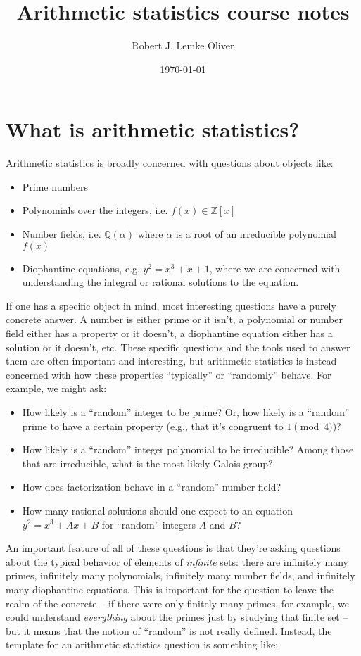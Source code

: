 \documentclass[12pt]{amsart}
\title{Arithmetic statistics course notes}
\author{Robert J. Lemke Oliver}
\date{\today}
\theoremstyle{definition} \newtheorem*{notation}{Notation}
\theoremstyle{remark} \newtheorem*{remark}{Remark}
\numberwithin{equation}{section}
\numberwithin{theorem}{section}
\begin{document}
	\maketitle
	
	\setcounter{section}{-1}
\section{What is arithmetic statistics?}
	
	Arithmetic statistics is broadly concerned with questions about objects like:
		\begin{itemize}
			\item Prime numbers
			\item Polynomials over the integers, i.e. $f(x) \in \mathbb{Z}[x]$
			\item Number fields, i.e. $\mathbb{Q}(\alpha)$ where $\alpha$ is a root of an irreducible polynomial $f(x)$
			\item Diophantine equations, e.g. $y^2 = x^3+x+1$, where we are concerned with understanding the integral or rational solutions to the equation.
		\end{itemize}
	If one has a specific object in mind, most interesting questions have a purely concrete answer.  A number is either prime or it isn't, a polynomial or number field either has a property or it doesn't, a diophantine equation either has a solution or it doesn't, etc.  These specific questions and the tools used to answer them are often important and interesting, but arithmetic statistics is instead concerned with how these properties ``typically'' or ``randomly'' behave.  For example, we might ask:
		\begin{itemize}
			\item How likely is a ``random'' integer to be prime?  Or, how likely is a ``random'' prime to have a certain property (e.g., that it's congruent to $1 \pmod{4}$)?
			\item  How likely is a ``random'' integer polynomial to be irreducible?  Among those that are irreducible, what is the most likely Galois group?
			\item How does factorization behave in a ``random'' number field?
			\item How many rational solutions should one expect to an equation $y^2 = x^3+Ax+B$ for ``random'' integers $A$ and $B$?
		\end{itemize}
		
	An important feature of all of these questions is that they're asking questions about the typical behavior of elements of \emph{infinite} sets: there are infinitely many primes, infinitely many polynomials, infinitely many number fields, and infinitely many diophantine equations.  This is important for the question to leave the realm of the concrete -- if there were only finitely many primes, for example, we could understand \emph{everything} about the primes just by studying that finite set -- but it means that the notion of ``random'' is not really defined.  Instead, the template for an arithmetic statistics question is something like:
		
\end{document}

